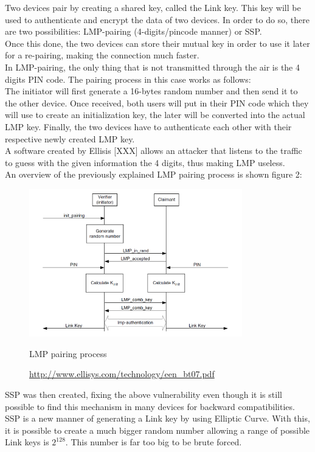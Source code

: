 Two devices pair by creating a shared key, called the Link key. This key will be used to authenticate and encrypt the data of two devices.
In order to do so, there are two possibilities: LMP-pairing (4-digits/pincode manner) or SSP. \\
Once this done, the two devices can store their mutual key in order to use it later for a re-pairing, making the connection much faster.\\
In LMP-pairing, the only thing that is not transmitted through the air is the 4 digits PIN code. The pairing process in this case works as follows: \\
The initiator will first generate a 16-bytes random number and then send it to the other device. Once received, both users will put in their PIN code which they will use to create an initialization key, the later will be converted into the actual LMP key. Finally, the two devices have to authenticate each other with their respective newly created LMP key. \\
A software created by Ellisis [XXX] allows an attacker that listens to the traffic to guess with the given information the 4 digits, thus making LMP useless. \\
An overview of the previously explained LMP pairing process is shown figure 2: 
\begin{figure}[!h]
  \begin{center}
	\includegraphics[width=350px]{images/haha.png}
	\label{LMP pairing}
	\caption{LMP pairing process}
	\caption*{\url{http://www.ellisys.com/technology/een_bt07.pdf}}
  \end{center}
\end{figure}


SSP was then created, fixing the above vulnerability even though it is still possible to find this mechanism in many devices for backward compatibilities. \\
SSP is a new manner of generating a Link key by using Elliptic Curve. With this, it is possible to create a much bigger random number allowing a range of possible Link keys is $2^{128}$. This number is far too big to be brute forced. 

